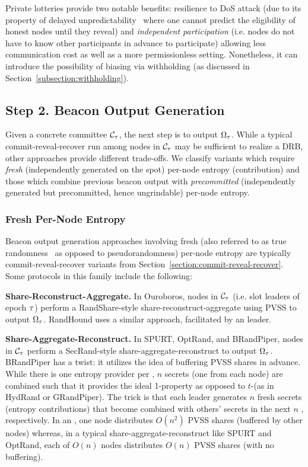 Private lotteries provide two notable benefits: resilience to DoS attack (due to its property of delayed unpredictability~\cite{azouvi2018winning} where one cannot predict the eligibility of honest nodes until they reveal) and \textit{independent participation} (i.e. nodes do not have to know other participants in advance to participate) allowing less communication cost as well as a more permissionless setting. Nonetheless, it can introduce the possibility of biasing via withholding (as discussed in Section~\ref{subsection:withholding}).

\subsection{Step 2. Beacon Output Generation}
\label{subsection:beacon-output-generation}
Given a concrete committee $\mathcal{C}_\tau$, the next step is to output $\Omega_\tau$. While a typical commit-reveal-recover run among nodes in $\mathcal{C}_\tau$ may be sufficient to realize a DRB, other approaches provide different trade-offs. We classify variants which require \textit{fresh} (independently generated on the spot) per-node entropy (contribution) and those which combine previous beacon output with \textit{precommitted} (independently generated but precommitted, hence ungrindable) per-node entropy.

\subsubsection{Fresh Per-Node Entropy}
\label{subsubsection:fresh}
Beacon output generation approaches involving fresh (also referred to as true randomness~\cite{cascudo2021mt, das2021spurt} as opposed to pseudorandomness) per-node entropy are typically commit-reveal-recover variants from Section~\ref{section:commit-reveal-recover}. Some protocols in this family include the following:

\noindent\textbf{Share-Reconstruct-Aggregate.} In Ouroboros, nodes in $\mathcal{C}_\tau$ (i.e. slot leaders of epoch $\tau$) perform a RandShare-style share-reconstruct-aggregate using PVSS to output $\Omega_\tau$. RandHound uses a similar approach, facilitated by an \epoch leader.

\noindent\textbf{Share-Aggregate-Reconstruct.} In SPURT, OptRand, and BRandPiper, nodes in $\mathcal{C}_\tau$ perform a SecRand-style share-aggregate-reconstruct to output $\Omega_\tau$. BRandPiper has a twist: it utilizes the idea of buffering PVSS shares in advance. While there is one entropy provider per \epoch, $n$ secrets (one from each node) are combined such that it provides the ideal 1-\interunpredictability property as opposed to $t$-\interunpredictability (as in HydRand or GRandPiper). The trick is that each \epoch leader generates $n$ fresh secrets (entropy contributions) that become combined with others' secrets in the next $n$ \epochs, respectively.
In an \epoch, one node distributes $O(n^2)$ PVSS shares (buffered by other nodes) whereas, in a typical share-aggregate-reconstruct like SPURT and OptRand, each of $O(n)$ nodes distributes $O(n)$ PVSS shares (with no buffering).

